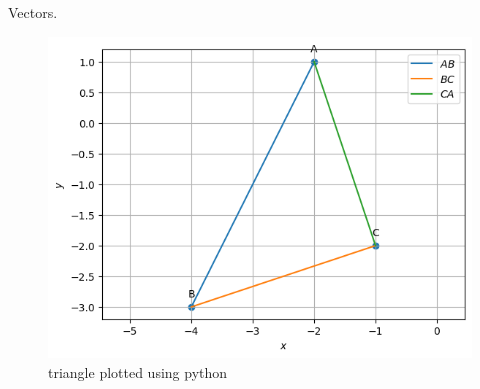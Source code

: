 \begin{table}[H]
        \centering
        
        \caption{Vectors.}
        \label{tab:Vectors}
    \end{table}
\begin{figure}[H]
\includegraphics[width=\columnwidth]{1-1/figs/Triangle.png}
\caption{triangle plotted using python}
\label{fig:i_triangle_py}
\end{figure}
